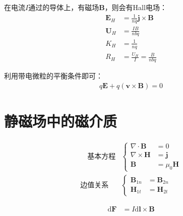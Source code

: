 \documentclass[12pt,onecolumn,a4paper]{book}
\newenvironment{block}[1]{
    \begin{tcolorbox}[colback=blue!5!white,colframe=blue!75!black,title=#1]
}{
    \end{tcolorbox}
}
\numberwithin{table}{subsection}
\numberwithin{equation}{subsection}
\begin{document}
在电流$I$通过的导体上，有磁场$\mathbf{B}$，则会有Hall电场：
\begin{align}
    \mathbf{E}_H & = \frac{1}{nq} \mathbf{j} \times \mathbf{B} \\
    \mathbf{U}_H & = \frac{IB}{nbq}                            \\
    K_H          & = \frac{1}{nq}                              \\
    R_H          & = \frac{U_H}{I} =  \frac{B}{nbq}
\end{align}

利用带电微粒的平衡条件即可：
\begin{align}
    q\mathbf{E} + q(\mathbf{v} \times \mathbf{B}) = 0
\end{align}

\chapter{静磁场中的磁介质}

\begin{block}{方程}
    \begin{align}
        \quad
        \text{基本方程} & \left\{
        \begin{aligned}
            \nabla \cdot \mathbf{B}  & = 0                \\
            \nabla \times \mathbf{H} & = \mathbf{j}       \\
            \mathbf{B}               & = \mu_0 \mathbf{H}
        \end{aligned}
        \right.               \\
        \text{边值关系} \quad
                    & \left\{
        \begin{aligned}
            \mathbf{B}_{1n} & = \mathbf{B}_{2n} \\
            \mathbf{H}_{1t} & = \mathbf{H}_{2t}
        \end{aligned}
        \right.
    \end{align}
\end{block}

\begin{block}{Ampere 力}
    \begin{align}
        \mathrm{d} \mathbf{F} & = I \mathrm{d} \mathbf{l} \times  \mathbf{B}
    \end{align}
\end{block}
\end{document}
